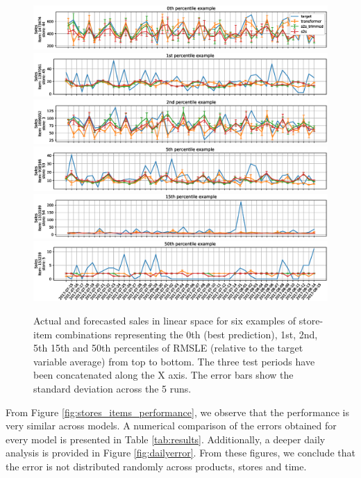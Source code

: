 \begin{figure}
\centering
\includegraphics[width=1\linewidth]{salesforecast/images/sample_0_lin}
\includegraphics[width=1\linewidth]{salesforecast/images/sample_1_lin}
\includegraphics[width=1\linewidth]{salesforecast/images/sample_2_lin}
\includegraphics[width=1\linewidth]{salesforecast/images/sample_3_lin}
\includegraphics[width=1\linewidth]{salesforecast/images/sample_4_lin}
\includegraphics[width=1\linewidth]{salesforecast/images/sample_5_lin}
\caption{Actual and forecasted sales in linear space for six examples of store-item combinations representing the 0th (best prediction), 1st, 2nd, 5th 15th and 50th percentiles of RMSLE (relative to the target variable average) from top to bottom. The three test periods have been concatenated along the X axis. The error bars show the standard deviation across the 5 runs.}
\label{fig:ts_lin}
\end{figure}

From Figure \ref{fig:stores_items_performance}, we observe that the performance is very similar across models. A numerical comparison of the errors obtained for every model is presented in Table \ref{tab:results}. Additionally, a deeper daily analysis is provided in Figure \ref{fig:dailyerror}. From these figures, we conclude that the error is not distributed randomly across products, stores and time. 

